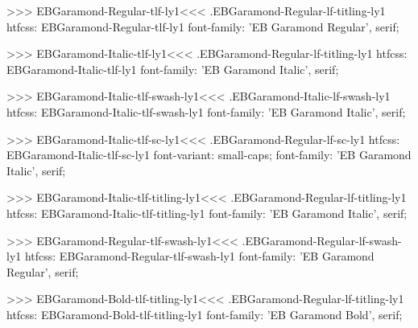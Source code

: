 {{>>>
\<EBGaramond-Regular-tlf-ly1\><<<
.EBGaramond-Regular-lf-titling-ly1
htfcss:  EBGaramond-Regular-tlf-ly1  font-family: 'EB Garamond Regular', serif;

>>>
\<EBGaramond-Italic-tlf-ly1\><<<
.EBGaramond-Regular-lf-titling-ly1
htfcss:  EBGaramond-Italic-tlf-ly1  font-family: 'EB Garamond Italic', serif;

>>>
\<EBGaramond-Italic-tlf-swash-ly1\><<<
.EBGaramond-Italic-lf-swash-ly1
htfcss:  EBGaramond-Italic-tlf-swash-ly1  font-family: 'EB Garamond Italic', serif;

>>>
\<EBGaramond-Italic-tlf-sc-ly1\><<<
.EBGaramond-Regular-lf-sc-ly1
htfcss:  EBGaramond-Italic-tlf-sc-ly1  font-variant: small-caps; font-family: 'EB Garamond Italic', serif;

>>>
\<EBGaramond-Italic-tlf-titling-ly1\><<<
.EBGaramond-Regular-lf-titling-ly1
htfcss:  EBGaramond-Italic-tlf-titling-ly1  font-family: 'EB Garamond Italic', serif;

>>>
\<EBGaramond-Regular-tlf-swash-ly1\><<<
.EBGaramond-Regular-lf-swash-ly1
htfcss:  EBGaramond-Regular-tlf-swash-ly1  font-family: 'EB Garamond Regular', serif;

>>>
\<EBGaramond-Bold-tlf-titling-ly1\><<<
.EBGaramond-Regular-lf-titling-ly1
htfcss:  EBGaramond-Bold-tlf-titling-ly1  font-family: 'EB Garamond Bold', serif;

}}
